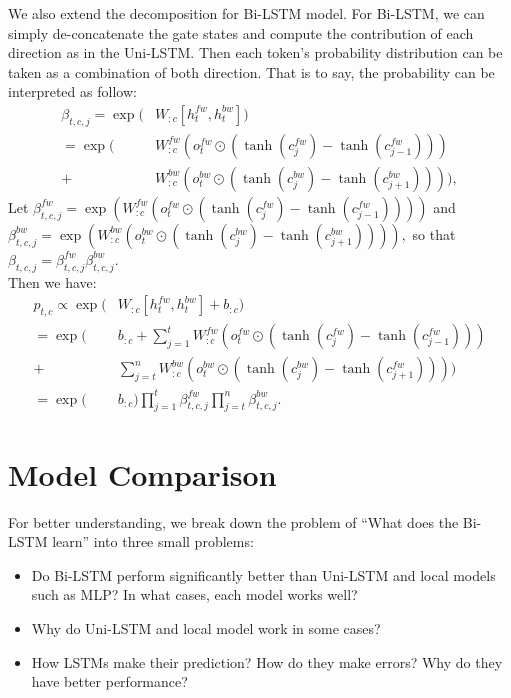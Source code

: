 \documentclass{article}
\begin{document}
We also extend the decomposition for Bi-LSTM model. For Bi-LSTM, we can simply de-concatenate the gate states and compute the contribution of each direction as in the Uni-LSTM. Then each token's probability distribution can be taken as a combination of both direction. That is to say, the probability can be interpreted as follow:
\begin{align}\label{eq:bi-beta} 
\beta_{t, c, j} = \exp(&W_{:c} [h_t^{fw}, h_t^{bw}])\\
= \exp(&W_{:c}^{fw} (o_t^{fw} \odot (\tanh(c_j^{fw})- \tanh(c_{j-1}^{fw}))) \\
+ &W_{:c}^{bw} (o_t^{bw} \odot (\tanh(c_j^{bw})- \tanh(c_{j+1}^{bw})))),
\end{align}
Let $ \beta_{t, c, j}^{fw} = \exp(W_{:c}^{fw} (o_t^{fw} \odot (\tanh(c_j^{fw})- \tanh(c_{j-1}^{fw})))) $
and $
\beta_{t, c, j}^{bw} = \exp(W_{:c}^{bw} (o_t^{bw} \odot (\tanh(c_j^{bw})- \tanh(c_{j+1}^{bw})))), $
so that $ \beta_{t, c, j} = \beta_{t, c, j}^{fw} \beta_{t, c, j}^{bw}$.\\
Then we have:
\begin{align}
p_{t, c} \propto \exp(&W_{:c} [h_t^{fw}, h_t^{bw}] + b_{:c}) \\
= \exp(&b_{:c} + \sum_{j=1}^t W_{:c}^{fw} (o_t^{fw} \odot (\tanh(c_j^{fw}) - \tanh(c_{j-1}^{fw})))\\
	+&\sum_{j=t}^n W_{:c}^{bw} (o_t^{bw} \odot (\tanh(c_j^{bw}) - \tanh(c_{j+1}^{fw}))))\\
=  \exp(&b_{:c})\prod_{j=1}^t \beta_{t, c, j}^{fw} \prod_{j=t}^n \beta_{t, c, j}^{bw}.
\end{align}

\section{Model Comparison} \label{sec:question}

For better understanding, we break down the problem of ``What does the Bi-LSTM learn'' into three small problems:

\begin{itemize}
	\item Do Bi-LSTM perform significantly better than Uni-LSTM and local models such as MLP? 
	In what cases, each model works well?
	\item Why do Uni-LSTM and local model work in some cases? 
	\item How LSTMs make their prediction? How do they make errors? Why do they have better performance?%
\end{itemize}
\end{document}

